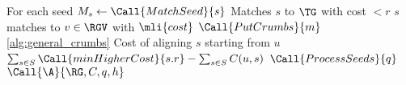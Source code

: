 \begin{algorithm}[t]
\begin{algorithmic}[1]
            \Comment For each seed
				\State $M_s \gets \Call{MatchSeed}{s}$
                \Comment Matches $s$ to $\TG$ with cost $<r$
                \Comment $s$ matches to $v \in \RGV$ with $\mli{cost}$
                    \State $\Call{PutCrumbs}{m}$
					\Comment \cref{alg:general_crumbs}
                \EndFor
			\EndFor
		\EndFunction
		\Statex
		\Comment Cost of aligning $s$ starting from $u$
			\State \Return $\sum_{s \in S} \Call{minHigherCost}{s.r} - \sum_{s \in S} C(u,s)$
		\EndFunction
        \Statex
         \label{lin:align}
            \State $\Call{ProcessSeeds}{q}$
            \State $\Call{\A}{\RG, C, q, h}$
        \EndFunction
	\end{algorithmic}
\end{algorithm}

